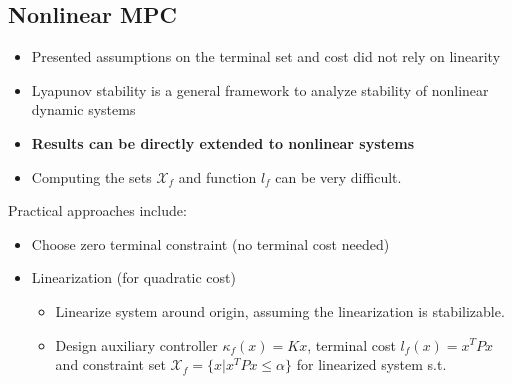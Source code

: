 \documentclass[8pt,a4paper]{scrartcl}
\begin{document}
\begin{multicols*}{3}
%
%
%

\section{Nonlinear MPC}

\begin{itemize}
\item Presented assumptions on the terminal set and cost did not rely on linearity
\item Lyapunov stability is a general framework to analyze stability of nonlinear dynamic systems
\item \textbf{Results can be directly extended to nonlinear systems}
\item Computing the sets $\mathcal{X}_f$ and function $l_f$ can be very difficult.
\end{itemize}

Practical approaches include:

\begin{itemize}
\item Choose zero terminal constraint (no terminal cost needed)
\item Linearization (for quadratic cost)
\begin{itemize}
\item Linearize system around origin, assuming the linearization is stabilizable.
\item Design auxiliary controller $\kappa_f(x)=Kx$, terminal cost $l_f(x)=x^TPx$ and constraint set $\mathcal{X}_f=\{x|x^TPx\leq\alpha\}$ for linearized system s.t.


\end{itemize}
\end{itemize}
\end{multicols*}
\end{document}
